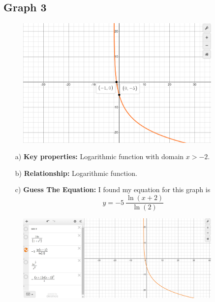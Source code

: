 \documentclass{article}
\begin{document}
\subsection{Graph 3}
\begin{figure}[h]
    \centering
    \includegraphics[width=0.9\textwidth]{imgs/imgs FSE/g_3.png}
    \label{fig:image}
\end{figure}
\begin{enumerate}
    \item[a)] \textbf{Key properties:} Logarithmic function with domain $x > -2$.
    \item[b)]  \textbf{Relationship:} Logarithmic function.
    \item[c)] \textbf{Guess The Equation: } I found my equation for this graph is $$y=-5\ \frac{\ln\left(x+2\right)}{\ln\left(2\right)}$$
\end{enumerate}
\begin{figure}[h]
    \centering
    \includegraphics[width=0.9\textwidth]{imgs/imgs FSE/-5_ln(x+2)_ln(2).png}
    \label{fig:image}
\end{figure}
\newpage 
\end{document}
